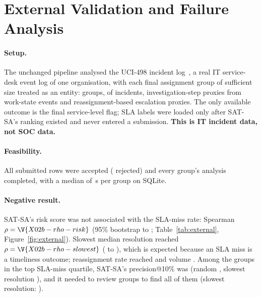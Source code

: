 \section{External Validation and Failure Analysis}
\label{sec:external}

\paragraph{Setup.}
The unchanged pipeline analysed the UCI-498 incident log~\citep{amaral2018uci498},
a real IT service-desk event log of one organisation, with each final assignment
group of sufficient size treated as an entity:  groups,
 of  incidents, 
investigation-step proxies from work-state events and 
reassignment-based escalation proxies. The only available outcome is the final
service-level flag; SLA labels were loaded only after SAT-SA's ranking existed and
never entered a submission. \textbf{This is IT incident data, not SOC data.}

\paragraph{Feasibility.}
All  submitted rows were accepted
( rejected) and every group's analysis completed, with a
median of \,s per group on SQLite.

\paragraph{Negative result.}
SAT-SA's risk score was not associated with the SLA-miss rate: Spearman
$\rho=\V{X02b-rho-risk}$ (95\% bootstrap  to
; Table~\ref{tab:external}, Figure~\ref{fig:external}).
Slowest median resolution reached $\rho=\V{X02b-rho-slowest}$
( to ), which is expected because an
SLA miss is a timeliness outcome; reassignment rate reached
 and volume . Among the
 groups in the top SLA-miss quartile, SAT-SA's precision@10\% was
 (random , slowest resolution
), and it needed to review  groups to
find all of them (slowest resolution: ).




